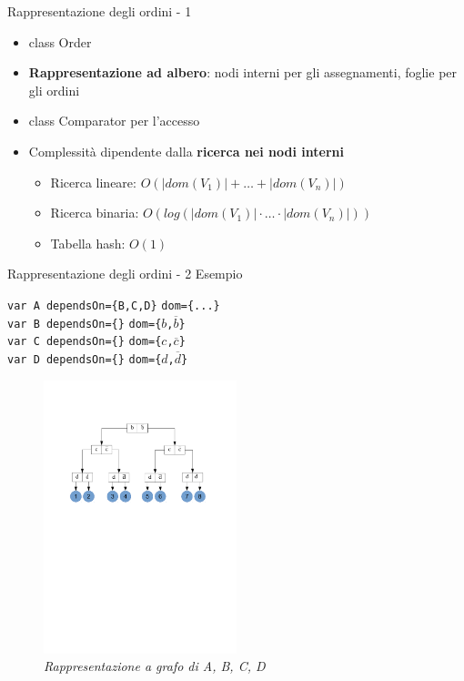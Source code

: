 \begin{frame}{Rappresentazione degli ordini - 1}
\begin{itemize}
  \item class Order
  \item \textbf{Rappresentazione ad albero}: nodi interni per gli assegnamenti, foglie per gli ordini
  \pause
  \item class Comparator per l'accesso
  \item Complessità dipendente dalla \textbf{ricerca nei nodi interni}
  \begin{itemize}
  	\item Ricerca lineare: $O(|dom(V_1)|+\ldots+|dom(V_n)|)$
  	\item Ricerca binaria: $O(log(|dom(V_1)|\cdot \ldots \cdot|dom(V_n)|))$
  	\item Tabella hash:    $O(1)$
  \end{itemize}
\end{itemize}
\end{frame}

\begin{frame}{Rappresentazione degli ordini - 2}
Esempio

\texttt{var A dependsOn=\{B,C,D\}}  \texttt{dom=\{...\}}\\
\texttt{var B dependsOn=\{\}}       \texttt{dom=\{$b$,$\overline{b}$\}}\\
\texttt{var C dependsOn=\{\}}       \texttt{dom=\{$c$,$\overline{c}$\}}\\
\texttt{var D dependsOn=\{\}}       \texttt{dom=\{$d$,$\overline{d}$\}}\\
\begin{center}
  \begin{figure}[ht]
    \centering
    \includegraphics[width=0.5\textwidth]{images/grafo-ordini}
    \caption{\textit{Rappresentazione a grafo di A, B, C, D}}
  \end{figure}
\end{center}
\end{frame}